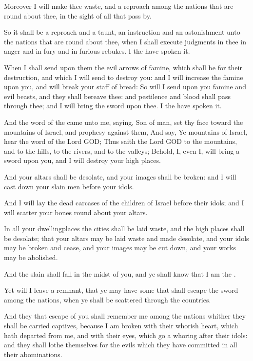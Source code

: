 \Verse Moreover I will make thee waste, and a reproach among the nations that are round about thee, in the sight of all that pass by.

\Verse So it shall be a reproach and a taunt, an instruction and an astonishment unto the nations that are round about thee, when I shall execute judgments in thee in anger and in fury and in furious rebukes.  I the \LORD have spoken it.

\Verse When I shall send upon them the evil arrows of famine, which shall be for their destruction, and which I will send to destroy you: and I will increase the famine upon you, and will break your staff of bread: \Verse So will I send upon you famine and evil beasts, and they shall bereave thee: and pestilence and blood shall pass through thee; and I will bring the sword upon thee. I the \LORD have spoken it.


\Chapter
\Verse And the word of the \LORD came unto me, saying, \Verse Son of man, set thy face toward the mountains of Israel, and prophesy against them, \Verse And say, Ye mountains of Israel, hear the word of the Lord GOD; Thus saith the Lord GOD to the mountains, and to the hills, to the rivers, and to the valleys; Behold, I, even I, will bring a sword upon you, and I will destroy your high places.

\Verse And your altars shall be desolate, and your images shall be broken: and I will cast down your slain men before your idols.

\Verse And I will lay the dead carcases of the children of Israel before their idols; and I will scatter your bones round about your altars.

\Verse In all your dwellingplaces the cities shall be laid waste, and the high places shall be desolate; that your altars may be laid waste and made desolate, and your idols may be broken and cease, and your images may be cut down, and your works may be abolished.

\Verse And the slain shall fall in the midst of you, and ye shall know that I am the \LORD.

\Verse Yet will I leave a remnant, that ye may have some that shall escape the sword among the nations, when ye shall be scattered through the countries.

\Verse And they that escape of you shall remember me among the nations whither they shall be carried captives, because I am broken with their whorish heart, which hath departed from me, and with their eyes, which go a whoring after their idols: and they shall lothe themselves for the evils which they have committed in all their abominations.

